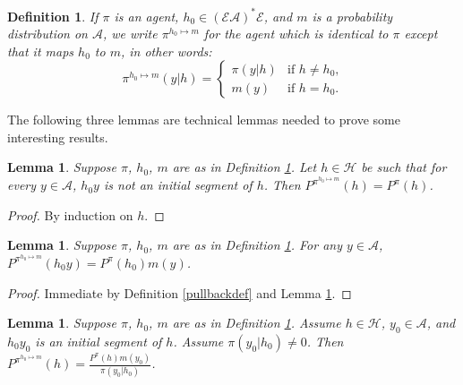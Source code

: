 \documentclass[twoside]{article}
\newtheorem{definition}[theorem]{Definition}
\newtheorem{lemma}[theorem]{Lemma}
\begin{document}
\begin{definition}
\label{modifyagentatoneplace}
    If $\pi$ is an agent, $h_0\in(\mathcal E\mathcal A)^*\mathcal E$,
    and $m$ is a probability distribution on $\mathcal A$,
    we write $\pi^{h_0\mapsto m}$ for the agent which is identical to $\pi$
    except that it maps $h_0$ to $m$, in other words:
    \[
        \pi^{h_0\mapsto m}(y|h)
        =
        \begin{cases}
            \pi(y|h) &\mbox{if $h\not=h_0$,}\\
            m(y) &\mbox{if $h=h_0$.}
        \end{cases}
    \]
\end{definition}

The following three lemmas are technical lemmas needed to prove
some interesting results.

\begin{lemma}
\label{firsttechlemmaforgenericity}
    Suppose $\pi$, $h_0$, $m$ are as in Definition \ref{modifyagentatoneplace}.
    Let $h\in\mathcal H$ be such that
    for every $y\in\mathcal A$,
    $h_0y$ is not an initial segment of $h$.
    Then $P^{\pi^{h_0\mapsto m}}(h)=P^\pi(h)$.
\end{lemma}

\begin{proof}
    By induction on $h$.
\end{proof}

\begin{lemma}
\label{thirdtechlemmaforgenericity}
    Suppose $\pi$, $h_0$, $m$ are as in Definition \ref{modifyagentatoneplace}.
    For any $y\in\mathcal A$,
    $P^{\pi^{h_0\mapsto m}}(h_0y)=P^\pi(h_0)m(y)$.
\end{lemma}

\begin{proof}
    Immediate by Definition \ref{pullbackdef} and Lemma \ref{firsttechlemmaforgenericity}.
\end{proof}

\begin{lemma}
\label{secondtechlemmaforgenericity}
    Suppose $\pi$, $h_0$, $m$ are as in Definition \ref{modifyagentatoneplace}.
    Assume $h\in\mathcal H$, $y_0\in\mathcal A$, and $h_0y_0$ is
    an initial segment of $h$. Assume $\pi(y_0|h_0)\not=0$. Then
    $P^{\pi^{h_0\mapsto m}}(h) = \frac{P^\pi(h)m(y_0)}{\pi(y_0|h_0)}$.
\end{lemma}
\end{document}
